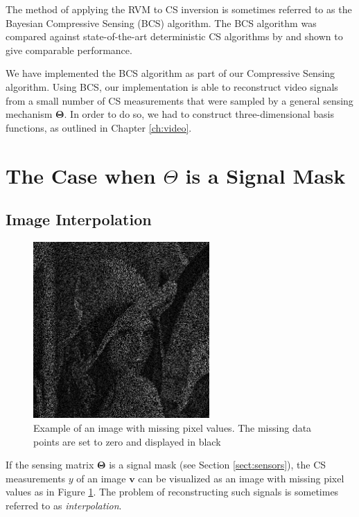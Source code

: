 The method of applying the RVM to CS inversion is sometimes referred to as the Bayesian Compressive Sensing (BCS) algorithm.
The BCS algorithm was compared against state-of-the-art deterministic CS algorithms by \cite{ji2008,pilikos2014} and shown to give comparable performance.

We have implemented the BCS algorithm as part of our Compressive Sensing algorithm.
Using BCS, our implementation is able to reconstruct video signals from a small number of CS measurements that were sampled by a general sensing mechanism $\bm\Theta$. 
In order to do so, we had to construct three-dimensional basis functions, as outlined in Chapter \ref{ch:video}.

\section{The Case when \texorpdfstring{$\Theta$}{[Theta]} is a Signal Mask}

\subsection{Image Interpolation}
\begin{figure}
  \centering
  \includegraphics[width=0.6\textwidth]{Chapter5/Images/lenna_MASKED.png}
  \caption[Example of masked image signal]{Example of an image with missing pixel values. The missing data points are set to zero and displayed in black}
  \label{fig:lenna_mask}
\end{figure}

If the sensing matrix $\bm\Theta$ is a signal mask (see Section \ref{sect:sensors}), the CS measurements $y$ of an image $\bm v$ can be visualized as an image with missing pixel values as in Figure \ref{fig:lenna_mask}.
The problem of reconstructing such signals is sometimes referred to as \emph{interpolation}.

